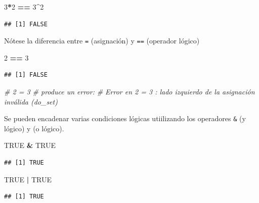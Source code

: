 \documentclass[]{book}
\newenvironment{Shaded}{\begin{snugshade}}{\end{snugshade}}
\newcommand{\CommentTok}[1]{\textcolor[rgb]{0.56,0.35,0.01}{\textit{#1}}}
\newcommand{\DecValTok}[1]{\textcolor[rgb]{0.00,0.00,0.81}{#1}}
\newcommand{\OperatorTok}[1]{\textcolor[rgb]{0.81,0.36,0.00}{\textbf{#1}}}
\newcommand{\OtherTok}[1]{\textcolor[rgb]{0.56,0.35,0.01}{#1}}
\newcommand{\StringTok}[1]{\textcolor[rgb]{0.31,0.60,0.02}{#1}}
\begin{document}
\begin{Shaded}
\begin{Highlighting}[]
\DecValTok{3}\OperatorTok{*}\DecValTok{2} \OperatorTok{==}\StringTok{ }\DecValTok{3}\OperatorTok{^}\DecValTok{2}
\end{Highlighting}
\end{Shaded}

\begin{verbatim}
## [1] FALSE
\end{verbatim}

Nótese la diferencia entre \texttt{=} (asignación) y \texttt{==} (operador lógico)

\begin{Shaded}
\begin{Highlighting}[]
\DecValTok{2} \OperatorTok{==}\StringTok{ }\DecValTok{3}
\end{Highlighting}
\end{Shaded}

\begin{verbatim}
## [1] FALSE
\end{verbatim}

\begin{Shaded}
\begin{Highlighting}[]
\CommentTok{# 2 = 3 # produce un error:}
\CommentTok{# Error en 2 = 3 : lado izquierdo de la asignación inválida (do_set)}
\end{Highlighting}
\end{Shaded}

Se pueden encadenar varias condiciones lógicas utiilizando
los operadores \texttt{\&} (y lógico) y \texttt{\textbar{}} (o lógico).

\begin{Shaded}
\begin{Highlighting}[]
\OtherTok{TRUE} \OperatorTok{&}\StringTok{ }\OtherTok{TRUE}
\end{Highlighting}
\end{Shaded}

\begin{verbatim}
## [1] TRUE
\end{verbatim}

\begin{Shaded}
\begin{Highlighting}[]
\OtherTok{TRUE} \OperatorTok{|}\StringTok{ }\OtherTok{TRUE}
\end{Highlighting}
\end{Shaded}

\begin{verbatim}
## [1] TRUE
\end{verbatim}
\end{document}
